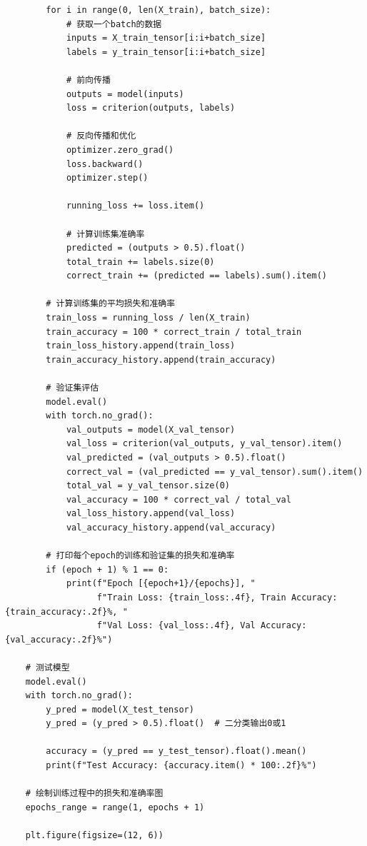 \documentclass[a4paper,11pt,AutoFakeBold]{ctexart}
\begin{document}
\begin{lstlisting}
        for i in range(0, len(X_train), batch_size):
            # 获取一个batch的数据
            inputs = X_train_tensor[i:i+batch_size]
            labels = y_train_tensor[i:i+batch_size]
            
            # 前向传播
            outputs = model(inputs)
            loss = criterion(outputs, labels)
            
            # 反向传播和优化
            optimizer.zero_grad()
            loss.backward()
            optimizer.step()
            
            running_loss += loss.item()
            
            # 计算训练集准确率
            predicted = (outputs > 0.5).float()
            total_train += labels.size(0)
            correct_train += (predicted == labels).sum().item()

        # 计算训练集的平均损失和准确率
        train_loss = running_loss / len(X_train)
        train_accuracy = 100 * correct_train / total_train
        train_loss_history.append(train_loss)
        train_accuracy_history.append(train_accuracy)
        
        # 验证集评估
        model.eval()
        with torch.no_grad():
            val_outputs = model(X_val_tensor)
            val_loss = criterion(val_outputs, y_val_tensor).item()
            val_predicted = (val_outputs > 0.5).float()
            correct_val = (val_predicted == y_val_tensor).sum().item()
            total_val = y_val_tensor.size(0)
            val_accuracy = 100 * correct_val / total_val
            val_loss_history.append(val_loss)
            val_accuracy_history.append(val_accuracy)
        
        # 打印每个epoch的训练和验证集的损失和准确率
        if (epoch + 1) % 1 == 0:
            print(f"Epoch [{epoch+1}/{epochs}], "
                  f"Train Loss: {train_loss:.4f}, Train Accuracy: {train_accuracy:.2f}%, "
                  f"Val Loss: {val_loss:.4f}, Val Accuracy: {val_accuracy:.2f}%")
    
    # 测试模型
    model.eval()
    with torch.no_grad():
        y_pred = model(X_test_tensor)
        y_pred = (y_pred > 0.5).float()  # 二分类输出0或1
        
        accuracy = (y_pred == y_test_tensor).float().mean()
        print(f"Test Accuracy: {accuracy.item() * 100:.2f}%")
    
    # 绘制训练过程中的损失和准确率图
    epochs_range = range(1, epochs + 1)
    
    plt.figure(figsize=(12, 6))
    

\end{lstlisting}
\end{document}
